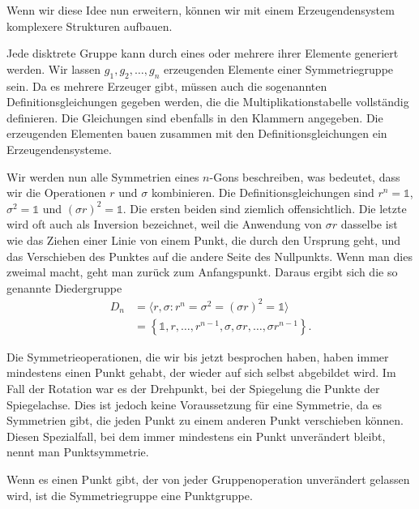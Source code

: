 Wenn wir diese Idee nun erweitern, können wir mit einem Erzeugendensystem
komplexere Strukturen aufbauen.

\begin{definition}[Erzeugendensysteme]
  Jede disktrete Gruppe kann durch eines oder mehrere ihrer Elemente generiert werden.
  Wir lassen \(g_1, g_2, \ldots, g_n\) erzeugenden Elemente einer Symmetriegruppe sein.
  Da es mehrere Erzeuger gibt, müssen auch die sogenannten Definitionsgleichungen gegeben werden, die die Multiplikationstabelle vollständig definieren.
  Die Gleichungen sind ebenfalls in den Klammern angegeben.
  Die erzeugenden Elementen bauen zusammen mit den Definitionsgleichungen ein Erzeugendensysteme.
\end{definition}
\begin{beispiel}
  Wir werden nun alle Symmetrien eines \(n\)-Gons beschreiben, was bedeutet, dass wir die Operationen \(r\) und \(\sigma\) kombinieren.
  Die Definitionsgleichungen sind \(r^n = \mathds{1}\), \(\sigma^2 = \mathds{1}\) und \((\sigma r)^2 = \mathds{1}\).
  Die ersten beiden sind ziemlich offensichtlich.
  Die letzte wird oft auch als Inversion bezeichnet, weil die Anwendung von \(\sigma r\) dasselbe ist wie das Ziehen einer Linie von einem Punkt, die durch den Ursprung geht, und das Verschieben des Punktes auf die andere Seite des Nullpunkts.
  Wenn man dies zweimal macht, geht man zurück zum Anfangspunkt.
  Daraus ergibt sich die so genannte Diedergruppe 
  \begin{align*}
    D_n &= \langle r, \sigma : r^n = \sigma^2 = (\sigma r)^2 = \mathds{1} \rangle \\
      &= \left\{
          \mathds{1}, r, \ldots, r^{n-1}, \sigma, \sigma r, \ldots, \sigma r^{n-1}
      \right\}.
  \end{align*}
\end{beispiel}

Die Symmetrieoperationen, die wir bis jetzt besprochen haben, haben immer mindestens einen Punkt gehabt, der wieder auf sich selbst abgebildet wird.
Im Fall der Rotation war es der Drehpunkt, bei der Spiegelung die Punkte der Spiegelachse.
Dies ist jedoch keine Voraussetzung für eine Symmetrie, da es Symmetrien gibt, die jeden Punkt zu einem anderen Punkt verschieben können.
 Diesen Spezialfall, bei dem immer mindestens ein Punkt unverändert bleibt, nennt man Punktsymmetrie.
\begin{definition}[Punktgruppe]
  Wenn es einen Punkt gibt, der von jeder Gruppenoperation unverändert gelassen wird, ist die Symmetriegruppe eine Punktgruppe.
\end{definition}

